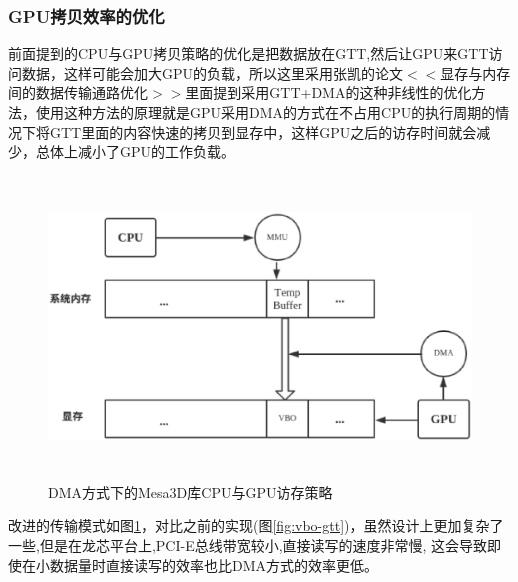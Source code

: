 \subsubsection{GPU拷贝效率的优化}

前面提到的CPU与GPU拷贝策略的优化是把数据放在GTT,然后让GPU来GTT访问数据，这样可能会加大GPU的负载，所以这里采用张凯的论文$<<$显存与内存间的数据传输通路优化$>>$\cite{gpu-cpu-data}里面提到采用GTT+DMA的这种非线性的优化方法，使用这种方法的原理就是GPU采用DMA的方式在不占用CPU的执行周期的情况下将GTT里面的内容快速的拷贝到显存中，这样GPU之后的访存时间就会减少，总体上减小了GPU的工作负载。

\begin{figure}[H] 
  \centering
  \includegraphics[width=12cm,height=8cm]{figures/chap03/gpu-dma}
  \caption{DMA方式下的Mesa3D库CPU与GPU访存策略}
  \label{fig:gpu-dma}
\end{figure}

改进的传输模式如图\ref{fig:gpu-dma}，对比之前的实现(图\ref{fig:vbo-gtt})，虽然设计上更加复杂了一些,但是在龙芯平台上,PCI-E总线带宽较小,直接读写的速度非常慢, 这会导致即使在小数据量时直接读写的效率也比DMA方式的效率更低。
